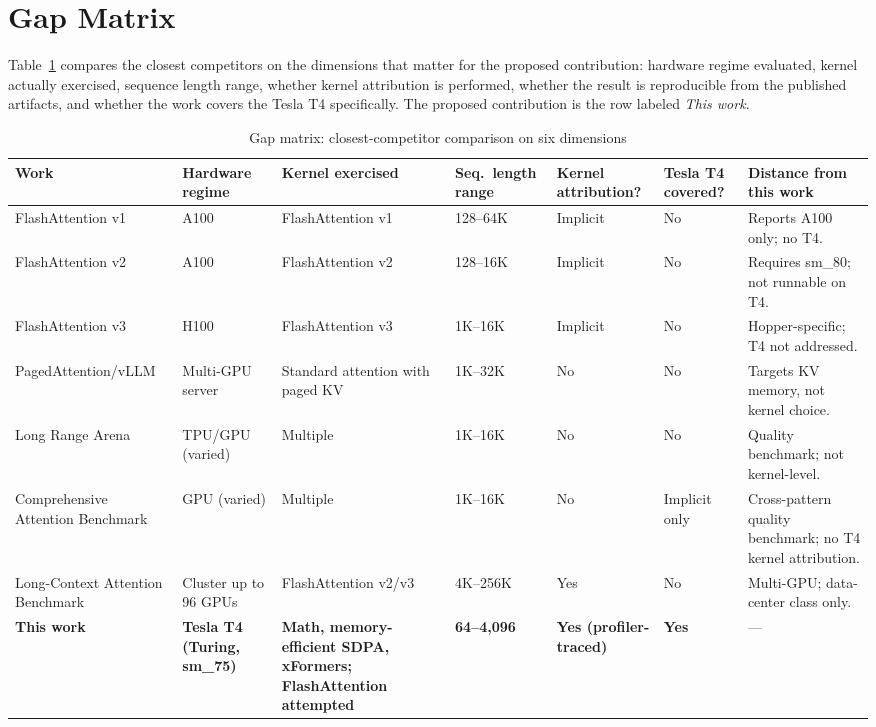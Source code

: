 \documentclass[11pt]{article}
\begin{document}
\section{Gap Matrix}
\label{sec:gap-matrix}

Table~\ref{tab:gap-matrix} compares the closest competitors on the dimensions that matter for the proposed contribution: hardware regime evaluated, kernel actually exercised, sequence length range, whether kernel attribution is performed, whether the result is reproducible from the published artifacts, and whether the work covers the Tesla T4 specifically. The proposed contribution is the row labeled \textit{This work}.

\begin{table}[h!]
\centering
\caption{Gap matrix: closest-competitor comparison on six dimensions}
\label{tab:gap-matrix}
\footnotesize
\begin{tabularx}{\textwidth}{p{2.4cm} p{1.7cm} p{2.0cm} p{1.6cm} p{1.4cm} p{1.4cm} X}
\toprule
\textbf{Work} & \textbf{Hardware regime} & \textbf{Kernel exercised} & \textbf{Seq.\ length range} & \textbf{Kernel attribution?} & \textbf{Tesla T4 covered?} & \textbf{Distance from this work} \\
\midrule
FlashAttention v1 \cite{dao2022flashattentionfastmemoryefficientexact} & A100 & FlashAttention v1 & 128--64K & Implicit & No & Reports A100 only; no T4. \\
FlashAttention v2 \cite{dao2023flashattention2fasterattentionbetter} & A100 & FlashAttention v2 & 128--16K & Implicit & No & Requires sm\_80; not runnable on T4. \\
FlashAttention v3 \cite{shah2024flashattention3fastaccurateattention} & H100 & FlashAttention v3 & 1K--16K & Implicit & No & Hopper-specific; T4 not addressed. \\
PagedAttention/vLLM \cite{kwon2023efficientmemorymanagementlarge} & Multi-GPU server & Standard attention with paged KV & 1K--32K & No & No & Targets KV memory, not kernel choice. \\
Long Range Arena \cite{tay2020longrangearenabenchmark} & TPU/GPU (varied) & Multiple & 1K--16K & No & No & Quality benchmark; not kernel-level. \\
Comprehensive Attention Benchmark \cite{zhang2025cabcomprehensiveattentionbenchmarking} & GPU (varied) & Multiple & 1K--16K & No & Implicit only & Cross-pattern quality benchmark; no T4 kernel attribution. \\
Long-Context Attention Benchmark \cite{bu2025longcontextattentionbenchmark} & Cluster up to 96 GPUs & FlashAttention v2/v3 & 4K--256K & Yes & No & Multi-GPU; data-center class only. \\
\midrule
\textbf{This work} & \textbf{Tesla T4 (Turing, sm\_75)} & \textbf{Math, memory-efficient SDPA, xFormers; FlashAttention attempted} & \textbf{64--4{,}096} & \textbf{Yes (profiler-traced)} & \textbf{Yes} & --- \\
\bottomrule
\end{tabularx}
\end{table}
\end{document}
